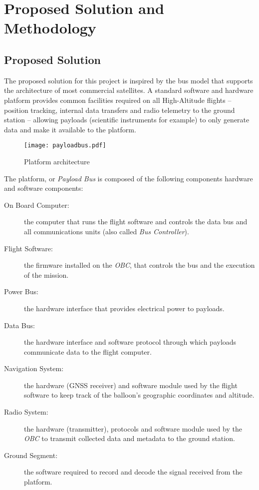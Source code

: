 \chapter{Proposed Solution and Methodology}
\label{ch:methodology}

\section{Proposed Solution}

The proposed solution for this project is inspired by the bus model that
supports the architecture of most commercial satellites. A standard software
and hardware platform provides common facilities required on all High-Altitude
flights – position tracking, internal data transfers and radio telemetry to the
ground station – allowing payloads (scientific instruments for example) to
only generate data and make it available to the platform.

\begin{figure}[H]
\texttt{[image: payloadbus.pdf]}
\centering
\caption{Platform architecture}
\end{figure}

The platform, or \textit{Payload Bus} is composed of the following components 
hardware and software components:

\begin{description}
    
\item[On Board Computer:] the computer that runs the flight software and
controls the data bus and all communications units (also called
\textit{Bus Controller}).

\item[Flight Software:] the firmware installed on the \textit{OBC}, that
controls the bus and the execution of the mission.

\item[Power Bus:] the hardware interface that provides electrical power to
payloads.

\item[Data Bus:] the hardware interface and software protocol through which
payloads communicate data to the flight computer.

\item[Navigation System:] the hardware (GNSS receiver) and software module used
by the flight software to keep track of the balloon's geographic coordinates and
altitude.

\item[Radio System:] the hardware (transmitter), protocols and software module
used by the \textit{OBC} to transmit collected data and metadata to the
ground station.

\item[Ground Segment:] the software required to record and decode the signal
received from the platform.
    
\end{description}

